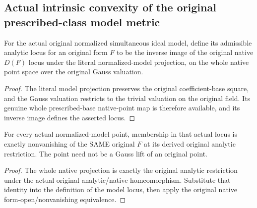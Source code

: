\subsection{Actual intrinsic convexity of the original prescribed-class model metric}

\begin{definition}
\label{local:actual-normalized-model-admissible-analytic-locus}
\leanok
{}
For the actual original normalized simultaneous ideal model, define its
admissible analytic locus for an original form $F$ to be the inverse image
of the original native $D(F)$ locus under the literal normalized-model
projection, on the whole native point space over the original Gauss valuation.
\end{definition}
\begin{proof}
The literal model projection preserves the original coefficient-base square,
and the Gauss valuation restricts to the trivial valuation on the original
field. Its genuine whole prescribed-base native-point map is therefore
available, and its inverse image defines the asserted locus.
\end{proof}

\begin{lemma}
\label{local:actual-normalized-model-admissible-nonvanishing}
\leanok
{}
For every actual normalized-model point, membership in that actual locus is
exactly nonvanishing of the SAME original $F$ at its derived original analytic
restriction. The point need not be a Gauss lift of an original point.
\end{lemma}
\begin{proof}
The whole native projection is exactly the original analytic restriction
under the actual original analytic/native homeomorphism. Substitute that
identity into the definition of the model locus, then apply the original
native form-open/nonvanishing equivalence.
\end{proof}

